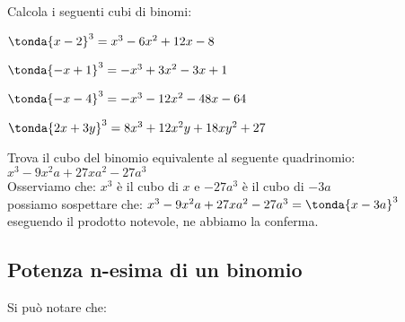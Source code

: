 
\begin{esempio}{}{} Calcola i seguenti cubi di binomi:
\begin{enumeratea}
\item \(\tonda{x-2}^3= x^3-6x^2+12x-8\)
\item \(\tonda{-x+1}^3= -x^3+3x^2-3x+1\)
\item \(\tonda{-x-4}^3= -x^3-12x^2-48x-64\)
\item \(\tonda{2x+3y}^3= 8x^3+12x^2y+18xy^2+27\)
\end{enumeratea}
\end{esempio}

\begin{esempio}{}{}
Trova il cubo del binomio equivalente al seguente quadrinomio:\\
\(x^3-9x^2a+27xa^2-27a^3\)\\
Osserviamo che: \(x^3\) è il cubo di \(x\) \quad 
e \quad \(-27a^3\) è il cubo di \(-3a\)\\
possiamo sospettare che: \(x^3-9x^2a+27xa^2-27a^3 = \tonda{x-3a}^3\)\\
eseguendo il prodotto notevole, ne abbiamo la conferma.
\end{esempio}


\subsection{Potenza n-esima di un binomio}
\label{subsec:prodnot_potenzabinomio}

Si può notare che:

